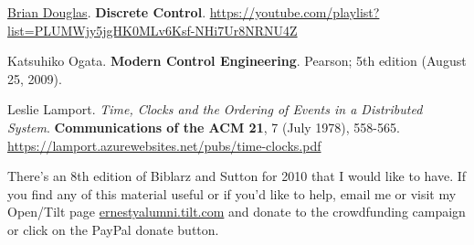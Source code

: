 \documentclass[10pt]{amsart}
\begin{document}
\begin{thebibliography}{9}
\href{https://www.youtube.com/channel/UCq0imsn84ShAe9PBOFnoIrg}{Brian Douglas}. \textbf{Discrete Control}. \url{https://youtube.com/playlist?list=PLUMWjy5jgHK0MLv6Ksf-NHi7Ur8NRNU4Z}

Katsuhiko Ogata. \textbf{Modern Control Engineering}. Pearson; 5th edition (August 25, 2009).

Leslie Lamport. \emph{Time, Clocks and the Ordering of Events in a Distributed System}. \textbf{Communications of the ACM 21}, 7   (July 1978), 558-565. \url{https://lamport.azurewebsites.net/pubs/time-clocks.pdf} 


  
\end{thebibliography}
There's an 8th edition of Biblarz and Sutton \cite{GSuttonOBiblarz2001} for 2010 that I would like to have.  If you find any of this material useful or if you'd like to help, email me or visit my Open/Tilt page \url{ernestyalumni.tilt.com} and donate to the crowdfunding campaign or click on the PayPal donate button.  



\clearpage
\onecolumn






\newpage


%
\end{document}
